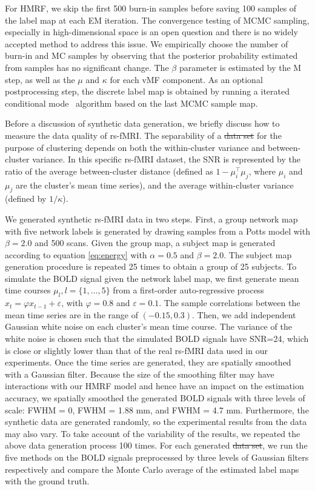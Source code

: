 \documentclass[review,authoryear]{elsarticle}
\providecommand{\DIFadd}[1]{{\protect\color{blue}\uwave{#1}}} %
\providecommand{\DIFdel}[1]{{\protect\color{red}\sout{#1}}}                      %
\providecommand{\DIFaddbegin}{} %
\providecommand{\DIFaddend}{} %
\providecommand{\DIFdelbegin}{} %
\providecommand{\DIFdelend}{} %
\begin{document}
For HMRF, we skip the first 500 burn-in samples before saving 100 samples of the
label map at each EM iteration. The convergence testing of MCMC sampling,
especially in high-dimensional space is an open question and there is no widely
accepted method to address this issue. We empirically choose the number of
burn-in and MC samples by observing that the posterior probability estimated
from samples has no significant change. The $\beta$ parameter is estimated by
the M step, as well as the $\mu$ and $\kappa$ for each vMF component.  As an
optional postprocessing step, the discrete label map is obtained by running a
iterated conditional mode~\citep{besag1986statistical} algorithm based on the
last MCMC sample map.

Before a discussion of synthetic data generation, we briefly discuss how to
measure the data quality of rs-fMRI. The separability of a \DIFdelbegin \DIFdel{data set }\DIFdelend \DIFaddbegin \DIFadd{dataset }\DIFaddend for the
purpose of clustering depends on both the within-cluster variance and
between-cluster variance. In this specific rs-fMRI dataset, the SNR is
represented by the ratio of the average between-cluster distance (defined as $1
-\mu_i^\intercal \mu_j$, where $\mu_i$ and $\mu_j$ are the cluster's mean time
series), and the average within-cluster variance (defined by $1/\kappa$).

We generated synthetic rs-fMRI data in two steps. First, a group network map
with five network labels is generated by drawing samples from a Potts model with
$\beta = 2.0$ and 500 scans. Given the group map, a subject map is generated
according to equation \eqref{eq:energy} with $\alpha=0.5$ and $\beta = 2.0$. The
subject map generation procedure is repeated 25 times to obtain a group of 25
subjects. To simulate the BOLD signal given the network label map, we first
generate mean time courses $\mu_l, l=\{1,\dots, 5\}$ from a first-order
auto-regressive process $x_t = \varphi x_{t-1} + \varepsilon$, with $\varphi =
0.8$ and $\varepsilon = 0.1$.  The sample correlations between the mean time
series are in the range of $(-0.15, 0.3)$. Then, we add independent Gaussian
white noise on each cluster's mean time course. The variance of the white noise
is chosen such that the simulated BOLD signals have SNR=24, which is close or
slightly lower than that of the real rs-fMRI data used in our experiments. Once
the time series are generated, they are spatially smoothed with a Gaussian
filter. Because the size of the smoothing filter may have interactions with our
HMRF model and hence have an impact on the estimation accuracy, we spatially
smoothed the generated BOLD signals with three levels of scale: FWHM = 0, FWHM =
1.88 mm, and FWHM = 4.7 mm.  Furthermore, the synthetic data are generated
randomly, so the experimental results from the data may also vary. To take
account of the variability of the results, we repeated the above data generation
process 100 times.  For each generated \DIFdelbegin \DIFdel{data set}\DIFdelend \DIFaddbegin \DIFadd{dataset}\DIFaddend , we run the five methods on the
BOLD signals preprocessed by three levels of Gaussian filters respectively and
compare the Monte Carlo average of the estimated label maps with the ground
truth.
\end{document}
